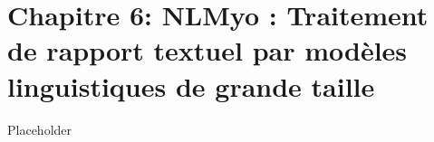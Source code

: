 \chapter*{Chapitre 6: NLMyo : Traitement de rapport textuel par modèles linguistiques de grande taille}
Placeholder